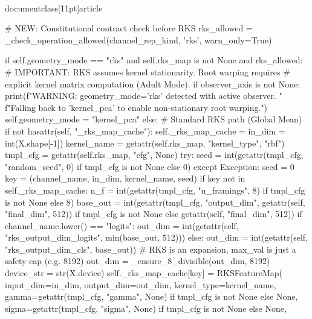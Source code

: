 \\documentclass[11pt]{article}
\begin{document}
\begin{CodeBlock}
            # NEW: Constitutional contract check before RKS
            rks_allowed = _check_operation_allowed(channel_rep_kind, 'rks', warn_only=True)
            
            if self.geometry_mode == "rks" and self.rks_map is not None and rks_allowed:
                # IMPORTANT: RKS assumes kernel stationarity. Root warping requires 
                # explicit kernel matrix computation (Adult Mode).
                if observer_axis is not None:
                    print(f"WARNING: geometry_mode='rks' detected with active observer. "
                          f"Falling back to 'kernel_pca' to enable non-stationary root warping.")
                    self.geometry_mode = "kernel_pca"
                else:
                    # Standard RKS path (Global Mean)
                    if not hasattr(self, "_rks_map_cache"):
                        self._rks_map_cache = {}
                    in_dim = int(X.shape[-1])
                    kernel_name = getattr(self.rks_map, "kernel_type", "rbf")
                    tmpl_cfg = getattr(self.rks_map, "cfg", None)
                    try:
                        seed = int(getattr(tmpl_cfg, "random_seed", 0) if tmpl_cfg is not None else 0)
                    except Exception:
                        seed = 0
                    key = (channel_name, in_dim, kernel_name, seed)
                    if key not in self._rks_map_cache:
                        n_f = int(getattr(tmpl_cfg, "n_framings", 8) if tmpl_cfg is not None else 8)
                        base_out = int(getattr(tmpl_cfg, "output_dim", getattr(self, "final_dim", 512)) if tmpl_cfg is not None else getattr(self, "final_dim", 512))
                        if channel_name.lower() == "logits":
                            out_dim = int(getattr(self, "rks_output_dim_logits", min(base_out, 512)))
                        else:
                            out_dim = int(getattr(self, "rks_output_dim_cls", base_out))
                        # RKS is an expansion, max_val is just a safety cap (e.g. 8192)
                        out_dim = _ensure_8_divisible(out_dim, 8192)
                        device_str = str(X.device)
                        self._rks_map_cache[key] = RKSFeatureMap(
                            input_dim=in_dim,
                            output_dim=out_dim,
                            kernel_type=kernel_name,
                            gamma=getattr(tmpl_cfg, "gamma", None) if tmpl_cfg is not None else None,
                            sigma=getattr(tmpl_cfg, "sigma", None) if tmpl_cfg is not None else None,

\end{CodeBlock}
\end{document}
